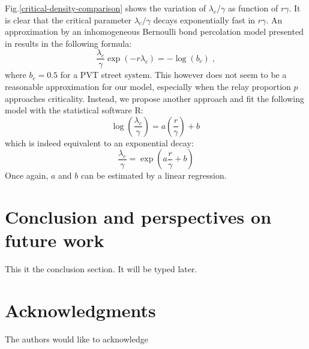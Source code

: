 \documentclass[conference]{IEEEtran}
\begin{document}
\indent Fig.\ref{critical-density-comparison} shows the variation of $\lambda_{c} / \gamma$ as function of $r\gamma$. It is clear that the critical parameter $\lambda_{c} / \gamma$ decays exponentially fast in $r\gamma$. An approximation by an inhomogeneous Bernoulli bond percolation model presented in \cite{hirsch_continuum_2017} results in the following formula:
\begin{equation}
\frac{\lambda_{c}}{\gamma}\exp(-r\lambda_{c}) = - \log(b_{c}) \; ,
\end{equation}
where $b_{c} = 0.5$ for a PVT street system. This however does not seem to be a reasonable approximation for our model, especially when  the relay proportion $p$ approaches criticality. Instead, we propose another approach and fit the following model with the statistical software R:
\begin{equation}
\log \left(\frac{\lambda_{c}}{\gamma}\right) = a \left(\frac{r}{\gamma}\right) + b \,
\end{equation}
which is indeed equivalent to an exponential decay:
\begin{equation}
\frac{\lambda_{c}}{\gamma} = \exp \left(a\frac{r}{\gamma}+b\right)
\end{equation}
Once again, $a$ and $b$ can be estimated by a linear regression.
\section{Conclusion and perspectives on future work}
This it the conclusion section. It will be typed later.
\section*{Acknowledgments}
The authors would like to acknowledge 




\end{document}
